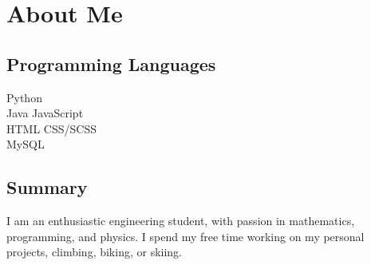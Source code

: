 \documentclass[]{deedy-resume-openfont}
\begin{document}
    \section{About Me}
    \begin{minipage}[t]{.35\textwidth}
    \subsection{Programming Languages}
    Python \\
    Java \textbullet{} JavaScript  \\ 
    HTML \textbullet{} CSS/SCSS \\
    MySQL
    \sectionsep
    \end{minipage}
    \hfill
    \begin{minipage}[t]{.55\textwidth}
    \subsection{Summary}
    I am an enthusiastic engineering student, with passion in mathematics, programming, and physics. I spend my free time working on my personal projects, climbing, biking, or skiing.
    \end{minipage}
    
    
\end{document}

